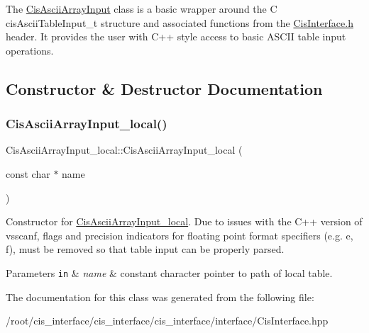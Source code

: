 The \mbox{\hyperlink{classCisAsciiArrayInput}{Cis\+Ascii\+Array\+Input}} class is a basic wrapper around the C cis\+Ascii\+Table\+Input\+\_\+t structure and associated functions from the \mbox{\hyperlink{CisInterface_8h_source}{Cis\+Interface.\+h}} header. It provides the user with C++ style access to basic A\+S\+C\+II table input operations. 

\subsection{Constructor \& Destructor Documentation}
\mbox{\label{classCisAsciiArrayInput__local_ab1a315749639f0edd562184bcdb34d42}} 
\subsubsection{\texorpdfstring{Cis\+Ascii\+Array\+Input\+\_\+local()}{CisAsciiArrayInput\_local()}}
{\footnotesize\ttfamily Cis\+Ascii\+Array\+Input\+\_\+local\+::\+Cis\+Ascii\+Array\+Input\+\_\+local (\begin{DoxyParamCaption}\item[{const char $\ast$}]{name }\end{DoxyParamCaption})\hspace{0.3cm}{\ttfamily [inline]}}



Constructor for \mbox{\hyperlink{classCisAsciiArrayInput__local}{Cis\+Ascii\+Array\+Input\+\_\+local}}. Due to issues with the C++ version of vsscanf, flags and precision indicators for floating point format specifiers (e.\+g. e, f), must be removed so that table input can be properly parsed. 


\begin{DoxyParams}[1]{Parameters}
\mbox{\tt in}  & {\em name} & constant character pointer to path of local table. \\
\hline
\end{DoxyParams}


The documentation for this class was generated from the following file\+:\begin{DoxyCompactItemize}
\item 
/root/cis\+\_\+interface/cis\+\_\+interface/cis\+\_\+interface/interface/Cis\+Interface.\+hpp\end{DoxyCompactItemize}
